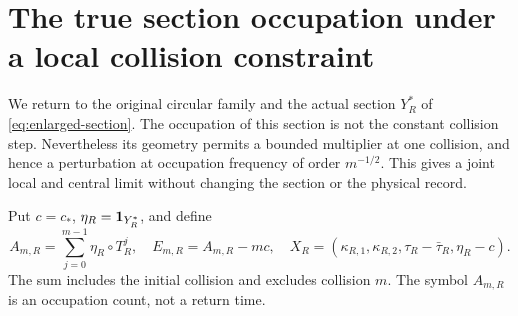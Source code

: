 \section{The true section occupation under a local collision constraint}
\label{sec:v37-occupation-local}
We return to the original circular family and the actual section
$Y_R^*$ of \eqref{eq:enlarged-section}. The occupation of this section
is not the constant collision step. Nevertheless its geometry permits
a bounded multiplier at one collision, and hence a perturbation at
occupation frequency of order $m^{-1/2}$. This gives a joint local and
central limit without changing the section or the physical record.

Put $c=c_*$, $\eta_R=\mathbf1_{Y_R^*}$, and define
\begin{equation}\label{eq:v37-occupation-record}
 A_{m,R}=\sum_{j=0}^{m-1}\eta_R\circ T_R^j,\quad
 E_{m,R}=A_{m,R}-mc,\quad
 X_R=(\kappa_{R,1},\kappa_{R,2},\tau_R-\bar\tau_R,\eta_R-c).
\end{equation}
The sum includes the initial collision and excludes collision $m$.
The symbol $A_{m,R}$ is an occupation count, not a return time.

